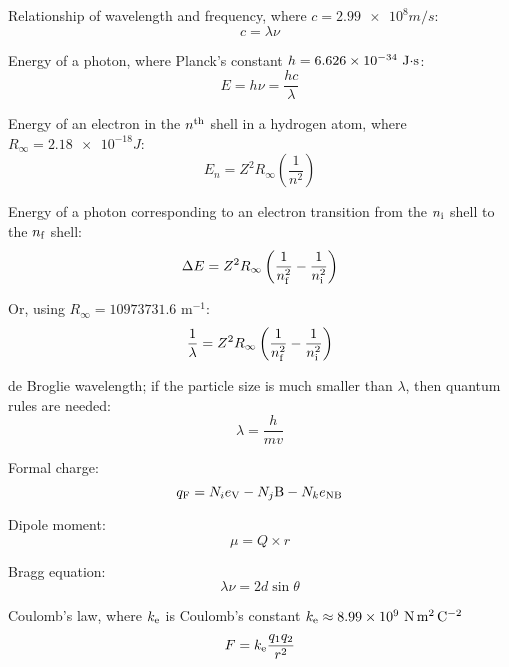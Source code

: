 \documentclass[10pt]{article}
\begin{document}
Relationship of wavelength and frequency, where $c=\num{2.99e8}\unit{m/s}$:
\begin{equation*}
c = \lambda\nu
\end{equation*}

Energy of a photon, where Planck's constant $h=\num{6.626e-34}\textnormal{ J$\cdot$s}$:
\begin{equation*}
E = h\nu = \frac{hc}{\lambda}
\end{equation*}

Energy of an electron in the $n^{\textnormal{th}}$ shell in a hydrogen atom, where $R_\infty=\num{2.18e-18}\unit{J}$:
\begin{equation*}
E_n=Z^2R_\infty\left(\frac{1}{n^2}\right)
\end{equation*}

Energy of a photon corresponding to an electron transition from the $n_\textnormal{i}$ shell to the $n_\textnormal{f}$ shell:
\begin{equation*}
\Delta E = Z^2R_\infty\left(\frac{1}{n_\textnormal{f}^2}-\frac{1}{n_\textnormal{i}^2}\right)
\end{equation*}

Or, using $R_\infty = 10973731.6$ m$^{-1}$:
\begin{equation*}
\frac{1}{\lambda} = Z^2R_\infty\left(\frac{1}{n_\textnormal{f}^2}-\frac{1}{n_\textnormal{i}^2}\right)
\end{equation*}

de Broglie wavelength; if the particle size is much smaller than $\lambda$, then quantum rules are needed:
\begin{equation*}
\lambda=\frac{h}{mv}
\end{equation*}

Formal charge:
\begin{equation*}
q_\textnormal{F} = N_ie_\textnormal{V} - N_j\textnormal{B} - N_ke_\textnormal{NB} 
\end{equation*}

Dipole moment:
\begin{equation*}
\mu = Q\times r
\end{equation*}

Bragg equation:
\begin{equation*}
\lambda\nu = 2d \sin \theta
\end{equation*}

Coulomb's law, where $k_\textnormal{e}$ is Coulomb's constant $k_{\textnormal{e}}\approx\num{8.99e9}~\si{\newton\meter\squared\per\coulomb\squared}$
\begin{equation*}
F = k_{\textnormal{e}}\frac{q_1q_2}{r^2}
\end{equation*}
\end{document}
